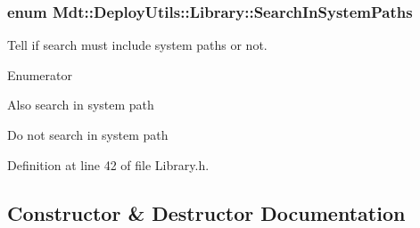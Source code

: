 \subsubsection[{\texorpdfstring{Search\+In\+System\+Paths}{SearchInSystemPaths}}]{\setlength{\rightskip}{0pt plus 5cm}enum {\bf Mdt\+::\+Deploy\+Utils\+::\+Library\+::\+Search\+In\+System\+Paths}}\hypertarget{class_mdt_1_1_deploy_utils_1_1_library_ab9f58dba8290dd1882a21d73cc7c10d0}{}\label{class_mdt_1_1_deploy_utils_1_1_library_ab9f58dba8290dd1882a21d73cc7c10d0}


Tell if search must include system paths or not. 

\begin{Desc}
\item[Enumerator]\par
\begin{description}
\item[{\em 
Include\+System\+Paths\hypertarget{class_mdt_1_1_deploy_utils_1_1_library_ab9f58dba8290dd1882a21d73cc7c10d0adabc8cd036aa884536c359cc3a2783ca}{}\label{class_mdt_1_1_deploy_utils_1_1_library_ab9f58dba8290dd1882a21d73cc7c10d0adabc8cd036aa884536c359cc3a2783ca}
}]Also search in system path \item[{\em 
Exclude\+System\+Paths\hypertarget{class_mdt_1_1_deploy_utils_1_1_library_ab9f58dba8290dd1882a21d73cc7c10d0ad00095fee49be0d8f0e8c7467dc8ebec}{}\label{class_mdt_1_1_deploy_utils_1_1_library_ab9f58dba8290dd1882a21d73cc7c10d0ad00095fee49be0d8f0e8c7467dc8ebec}
}]Do not search in system path \end{description}
\end{Desc}


Definition at line 42 of file Library.\+h.



\subsection{Constructor \& Destructor Documentation}
